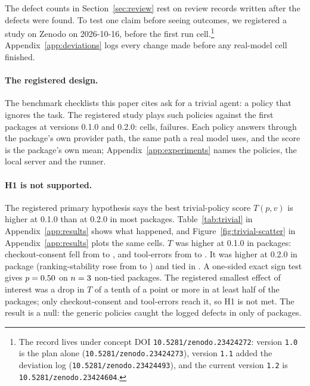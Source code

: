 The defect counts in Section~\ref{sec:review} rest on review records written after the defects were found. To test one claim before seeing outcomes, we registered a study on Zenodo on 2026-10-16, before the first run cell.\footnote{The record lives under concept DOI \texttt{10.5281/zenodo.23424272}: version \texttt{1.0} is the plan alone (\texttt{10.5281/zenodo.23424273}), version \texttt{1.1} added the deviation log (\texttt{10.5281/zenodo.23424493}), and the current version \texttt{1.2} is \texttt{10.5281/zenodo.23424604}.} Appendix~\ref{app:deviations} logs every change made before any real-model cell finished.

\paragraph{The registered design.}
The benchmark checklists this paper cites ask for a trivial agent: a policy that ignores the task. The registered study plays \trivialPolicies{} such policies against the first \trivialPackages{} packages at versions 0.1.0 and 0.2.0: \trivialCells{} cells, \trivialFailures{} failures. Each policy answers through the package's own provider path, the same path a real model uses, and the score is the package's own mean; Appendix~\ref{app:experiments} names the policies, the local server and the runner.

\paragraph{H1 is not supported.}
The registered primary hypothesis says the best trivial-policy score $T(p,v)$ is higher at 0.1.0 than at 0.2.0 in most packages. Table~\ref{tab:trivial} in Appendix~\ref{app:results} shows what happened, and Figure~\ref{fig:trivial-scatter} in Appendix~\ref{app:results} plots the same cells. $T$ was higher at 0.1.0 in \trivialHigherOld{} packages: checkout-consent fell from \expTrivCheckoutConsentOld{} to \expTrivCheckoutConsentNew{}, and tool-errors from \expTrivToolErrorsOld{} to \expTrivToolErrorsNew{}. It was higher at 0.2.0 in \trivialHigherNew{} package (ranking-stability rose from \expTrivRankingStabilityOld{} to \expTrivRankingStabilityNew{}) and tied in \trivialTied{}. A one-sided exact sign test gives $p = 0.50{}$ on $n = 3{}$ non-tied packages. The registered smallest effect of interest was a drop in $T$ of a tenth of a point or more in at least half of the packages; only checkout-consent and tool-errors reach it, so H1 is not met. The result is a null: the generic policies caught the logged defects in only \trivialHigherOld{} of \trivialPackages{} packages.

